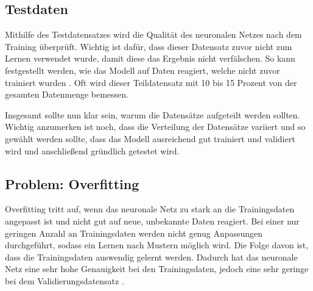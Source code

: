 \subsection{Testdaten}
Mithilfe des Testdatensatzes wird die Qualität des neuronalen Netzes nach dem Training überprüft. Wichtig ist dafür, dass dieser Datensatz zuvor nicht zum Lernen verwendet wurde, 
damit diese das Ergebnis nicht verfälschen.
So kann festgestellt werden, wie das Modell auf Daten reagiert, welche nicht zuvor trainiert wurden \cite[Seite 80f]{CA18}.
Oft wird dieser Teildatensatz mit 10 bis 15 Prozent von der gesamten Datenmenge bemessen.

\noindent
Insgesamt sollte nun klar sein, warum die Datensätze aufgeteilt werden sollten. 
Wichtig anzumerken ist noch, dass die Verteilung der Datensätze variiert und so gewählt werden sollte, dass das Modell ausreichend gut trainiert und validiert wird und anschließend gründlich getestet wird.

\subsection{Problem: Overfitting}
Overfitting tritt auf, wenn das neuronale Netz zu stark an die Trainingsdaten angepasst ist und nicht gut auf neue, unbekannte Daten reagiert. 
Bei einer nur geringen Anzahl an Trainingsdaten werden nicht genug Anpassungen durchgeführt, sodass ein Lernen nach Mustern möglich wird. Die Folge davon ist, dass die Trainingsdaten auswendig gelernt werden.
Dadurch hat das neuronale Netz eine sehr hohe Genauigkeit bei den Trainingsdaten, jedoch eine sehr geringe bei dem Validierungsdatensatz \cite[Seite 25]{CA18}. 